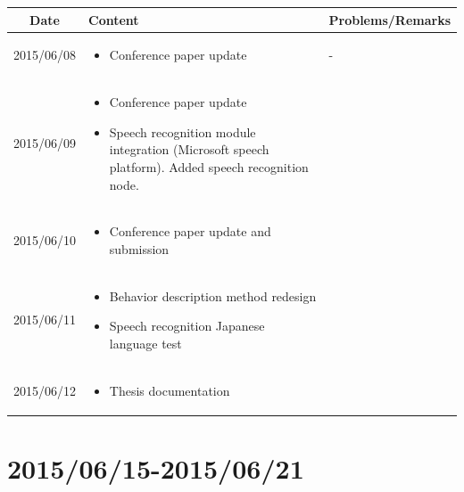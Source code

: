 \documentclass[11pt]{article} %
\begin{document}
\begin{center}
    \begin{longtable}{ | c | p{6cm} | p{5cm} |}
    \hline
    Date & Content & Problems/Remarks \\ 
    \endhead
    \hline    
     2015/06/08         & 
  	\begin{itemize}
  	\item Conference paper update
	\end{itemize}  
   & - \\
\hline
  										 
 2015/06/09         & 
  \begin{itemize}
  \item Conference paper update
  \item Speech recognition module integration (Microsoft speech platform). Added speech recognition node.
\end{itemize}   
& 
 \\
\hline
  										 
  
  2015/06/10        & 
  \begin{itemize}
  \item Conference paper update and submission
  \end{itemize}   
  										 & 
 
  										 \\
  \hline
  
  2015/06/11         & 
  \begin{itemize}
  \item Behavior description method redesign
  \item Speech recognition Japanese language test
  \end{itemize}
  & 
\\  										 \hline

  2015/06/12         & 
  \begin{itemize}
  \item Thesis documentation
\end{itemize}   
  & 
\\  										 \hline										 							 
  										   								 
    \end{longtable}
\end{center}


\newpage
\section{2015/06/15-2015/06/21}
\end{document}
